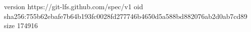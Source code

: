 version https://git-lfs.github.com/spec/v1
oid sha256:755b62ebafe7b64b193fc0028fd277746b4650d5a588bd882076ab2d0ab7cd89
size 174916
